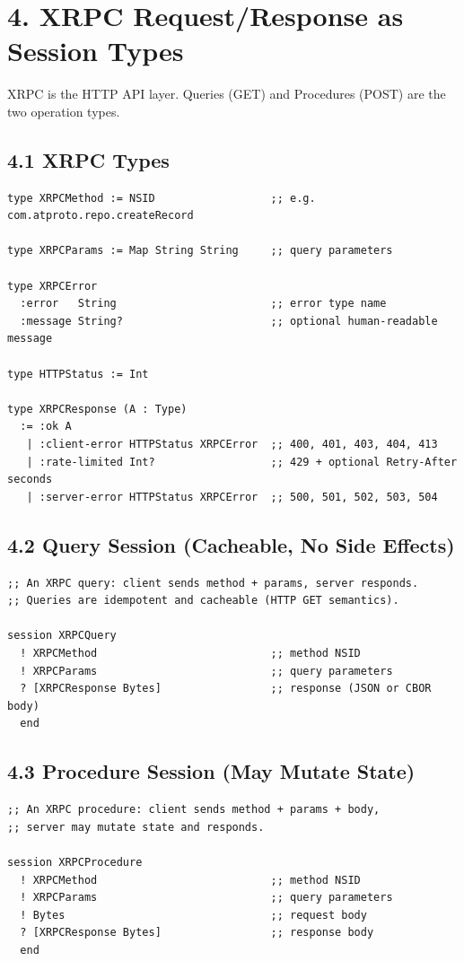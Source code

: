 \documentclass[11pt]{article}
\begin{document}
\section{4. XRPC Request/Response as Session Types}
\label{sec:orga4635b8}

XRPC is the HTTP API layer. Queries (GET) and Procedures (POST) are the
two operation types.
\subsection{4.1 XRPC Types}
\label{sec:org7c2c14b}

\begin{verbatim}
type XRPCMethod := NSID                  ;; e.g. com.atproto.repo.createRecord

type XRPCParams := Map String String     ;; query parameters

type XRPCError
  :error   String                        ;; error type name
  :message String?                       ;; optional human-readable message

type HTTPStatus := Int

type XRPCResponse (A : Type)
  := :ok A
   | :client-error HTTPStatus XRPCError  ;; 400, 401, 403, 404, 413
   | :rate-limited Int?                  ;; 429 + optional Retry-After seconds
   | :server-error HTTPStatus XRPCError  ;; 500, 501, 502, 503, 504
\end{verbatim}
\subsection{4.2 Query Session (Cacheable, No Side Effects)}
\label{sec:org778e493}

\begin{verbatim}
;; An XRPC query: client sends method + params, server responds.
;; Queries are idempotent and cacheable (HTTP GET semantics).

session XRPCQuery
  ! XRPCMethod                           ;; method NSID
  ! XRPCParams                           ;; query parameters
  ? [XRPCResponse Bytes]                 ;; response (JSON or CBOR body)
  end
\end{verbatim}
\subsection{4.3 Procedure Session (May Mutate State)}
\label{sec:org51c8767}

\begin{verbatim}
;; An XRPC procedure: client sends method + params + body,
;; server may mutate state and responds.

session XRPCProcedure
  ! XRPCMethod                           ;; method NSID
  ! XRPCParams                           ;; query parameters
  ! Bytes                                ;; request body
  ? [XRPCResponse Bytes]                 ;; response body
  end
\end{verbatim}
\end{document}
